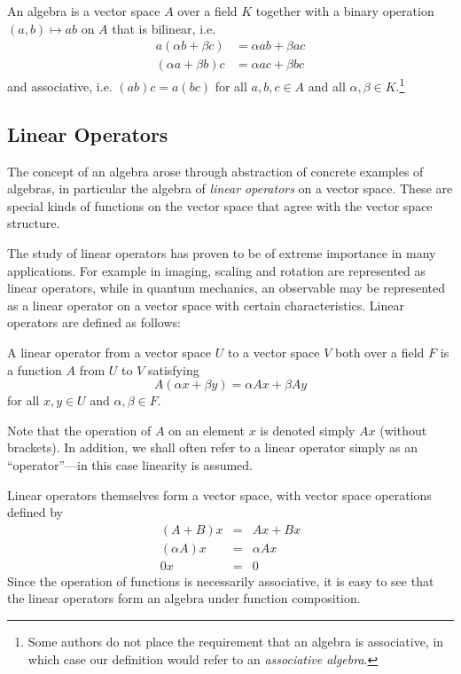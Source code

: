 \documentclass[12pt]{report}
\begin{document}

\begin{defn}
An algebra is a vector space $A$ over a field $K$ together with a binary operation $(a,b)\mapsto ab$ on $A$ that is bilinear, i.e.
\begin{align*}
a(\alpha b + \beta c) &= \alpha ab + \beta ac\\
(\alpha a+\beta b)c &= \alpha ac + \beta bc
\end{align*}
and associative, i.e. $(ab)c = a(bc)$ for all $a,b,c\in A$ and all $\alpha,\beta \in K$.\footnote{Some authors do not place the requirement that an algebra is associative, in which case our definition would refer to an \emph{associative algebra}.}
\end{defn}


\subsection{Linear Operators}
\label{operators}

The concept of an algebra arose through abstraction of concrete examples of algebras, in particular the algebra of \emph{linear operators} on a vector space. These are special kinds of functions on the vector space that agree with the vector space structure.

The study of linear operators has proven to be of extreme importance in many applications. For example in imaging, scaling and rotation are represented as linear operators, while in quantum mechanics, an observable may be represented as a linear operator on a vector space with certain characteristics. Linear operators are defined as follows:
\begin{defn}
A linear operator from a vector space $U$ to a vector space $V$ both over a field $F$ is a function $A$ from $U$ to $V$ satisfying
$$A(\alpha x + \beta y) = \alpha Ax + \beta Ay$$
for all $x,y \in U$ and $\alpha, \beta \in F$.
\end{defn}
Note that the operation of $A$ on an element $x$ is denoted simply $Ax$ (without brackets). In addition, we shall often refer to a linear operator simply as an ``operator''---in this case linearity is assumed.

Linear operators themselves form a vector space, with vector space operations defined by
\begin{eqnarray*}
(A + B)x&=&Ax + Bx\\
(\alpha A)x&=&\alpha Ax\\
0x&=&0
\end{eqnarray*}
Since the operation of functions is necessarily associative, it is easy to see that the linear operators form an algebra under function composition.
\end{document}
